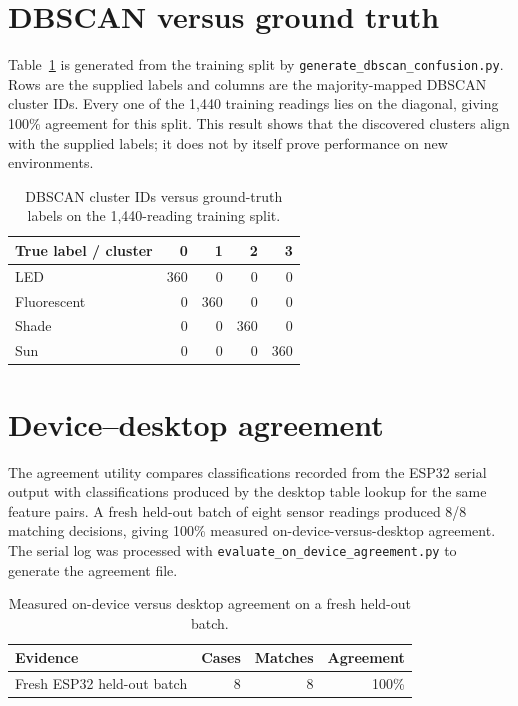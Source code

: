 \documentclass[10pt,a4paper,twocolumn]{article}
\begin{document}
\section{DBSCAN versus ground truth}

Table~\ref{tab:dbscan-confusion} is generated from the training split by
\texttt{generate\_dbscan\_confusion.py}. Rows are the supplied labels and
columns are the majority-mapped DBSCAN cluster IDs. Every one of the 1,440
training readings lies on the diagonal, giving 100\% agreement for this split.
This result shows that the discovered clusters align with the supplied labels;
it does not by itself prove performance on new environments.

\begin{table}[!bt]
\centering
\caption{DBSCAN cluster IDs versus ground-truth labels on the 1,440-reading
training split.}
\label{tab:dbscan-confusion}
\setlength{\tabcolsep}{4pt}
\begin{tabular}{@{}lrrrr@{}}
\toprule
True label / cluster & 0 & 1 & 2 & 3 \\
\midrule
LED         & 360 & 0   & 0   & 0 \\
Fluorescent & 0   & 360 & 0   & 0 \\
Shade       & 0   & 0   & 360 & 0 \\
Sun         & 0   & 0   & 0   & 360 \\
\bottomrule
\end{tabular}
\end{table}

\section{Device--desktop agreement}

The agreement utility compares classifications recorded from the ESP32 serial
output with classifications produced by the desktop table lookup for the same
feature pairs. A fresh held-out batch of eight sensor readings produced 8/8
matching decisions, giving 100\% measured on-device-versus-desktop agreement.
The serial log was processed with
\texttt{evaluate\_on\_device\_agreement.py} to generate the agreement file.

\begin{table}[!bt]
\centering
\caption{Measured on-device versus desktop agreement on a fresh held-out batch.}
\label{tab:agreement}
\begin{tabularx}{\columnwidth}{@{}Xrrr@{}}
\toprule
Evidence & Cases & Matches & Agreement \\
\midrule
Fresh ESP32 held-out batch & 8 & 8 & 100\% \\
\bottomrule
\end{tabularx}
\end{table}
\end{document}
